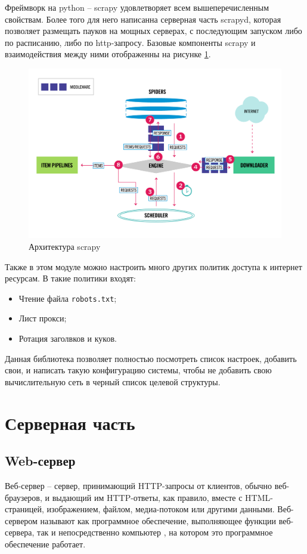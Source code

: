
Фреймворк на python -- scrapy удовлетворяет всем вышеперечисленным свойствам.
Более того для него написанна серверная часть scrapyd, которая позволяет
размещать пауков на мощных серверах, с последующим запуском либо по
расписанию, либо по http-запросу. Базовые компоненты scrapy и взаимодействия
между ними отображенны на рисунке \ref{fig:scrapy-arch}.
\begin{figure}[H]
    \centering
    \includegraphics[scale=0.35]{inc/img/scrapy_architecture.png}
    \caption{Архитектура scrapy}
    \label{fig:scrapy-arch}
\end{figure}

Также в этом модуле можно настроить много других политик доступа к интернет ресурсам. В такие политики входят:
\begin{itemize}
    \item Чтение файла \verb|robots.txt|;
    \item Лист прокси;
    \item Ротация заголвков и куков.
\end{itemize}

Данная библиотека позволяет полностью посмотреть список настроек, добавить свои,
и написать такую конфигурацию системы, чтобы не добавить свою вычислительную
сеть в черный список целевой структуры.

\section{Серверная часть}
\subsection{Web-сервер}
Веб-сервер -- сервер, принимающий HTTP-запросы от клиентов, обычно веб-браузеров,
и выдающий им HTTP-ответы, как правило, вместе с HTML-страницей, изображением,
файлом, медиа-потоком или другими данными. Веб-сервером называют как программное
обеспечение, выполняющее функции веб-сервера, так и непосредственно компьютер ,
на котором это программное обеспечение работает.

